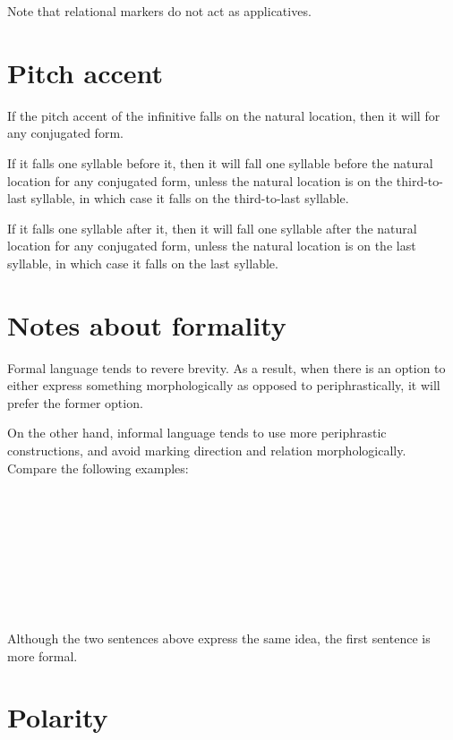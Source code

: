 \documentclass{book}
\begin{document}
Note that relational markers do not act as applicatives.

\section{Pitch accent}

If the pitch accent of the infinitive falls on the natural location, then it will for any conjugated form.

If it falls one syllable before it, then it will fall one syllable before the natural location for any conjugated form, unless the natural location is on the third-to-last syllable, in which case it falls on the third-to-last syllable.

If it falls one syllable after it, then it will fall one syllable after the natural location for any conjugated form, unless the natural location is on the last syllable, in which case it falls on the last syllable.

\section{Notes about formality}

Formal language tends to revere brevity. As a result, when there is an option to either express something morphologically as opposed to periphrastically, it will prefer the former option.

On the other hand, informal language tends to use more periphrastic constructions, and avoid marking direction and relation morphologically. Compare the following examples: \\
~\\
 \\
 \\
~\\
   \\
   \\
\emph{   } \\
~

Although the two sentences above express the same idea, the first sentence is more formal.

\section{Polarity}
\end{document}
